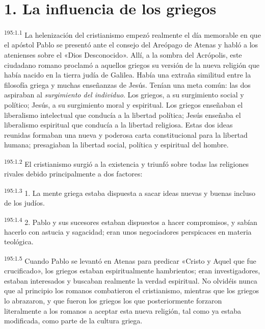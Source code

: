 \section*{1. La influencia de los griegos}
\par 
\textsuperscript{195:1.1} La helenización del cristianismo empezó realmente el día memorable en que el apóstol Pablo se presentó ante el consejo del Areópago de Atenas y habló a los atenienses sobre el «Dios Desconocido». Allí, a la sombra del Acrópolis, este ciudadano romano proclamó a aquellos griegos su versión de la nueva religión que había nacido en la tierra judía de Galilea. Había una extraña similitud entre la filosofía griega y muchas enseñanzas de Jesús. Tenían una meta común: las dos aspiraban al \textit{surgimiento del individuo}. Los griegos, a su surgimiento social y político; Jesús, a su surgimiento moral y espiritual. Los griegos enseñaban el liberalismo intelectual que conducía a la libertad política; Jesús enseñaba el liberalismo espiritual que conducía a la libertad religiosa. Estas dos ideas reunidas formaban una nueva y poderosa carta constitucional para la libertad humana; presagiaban la libertad social, política y espiritual del hombre.

\par 
\textsuperscript{195:1.2} El cristianismo surgió a la existencia y triunfó sobre todas las religiones rivales debido principalmente a dos factores:

\par 
\textsuperscript{195:1.3} 1. La mente griega estaba dispuesta a sacar ideas nuevas y buenas incluso de los judíos.

\par 
\textsuperscript{195:1.4} 2. Pablo y sus sucesores estaban dispuestos a hacer compromisos, y sabían hacerlo con astucia y sagacidad; eran unos negociadores perspicaces en materia teológica.

\par 
\textsuperscript{195:1.5} Cuando Pablo se levantó en Atenas para predicar «Cristo y Aquel que fue crucificado», los griegos estaban espiritualmente hambrientos; eran investigadores, estaban interesados y buscaban realmente la verdad espiritual. No olvidéis nunca que al principio los romanos combatieron el cristianismo, mientras que los griegos lo abrazaron, y que fueron los griegos los que posteriormente forzaron literalmente a los romanos a aceptar esta nueva religión, tal como ya estaba modificada, como parte de la cultura griega.

